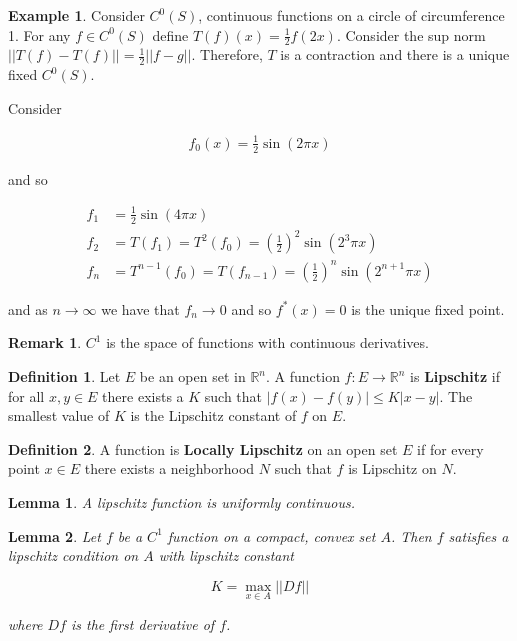 \documentclass[12pt]{article}
\newtheorem*{lemma}{Lemma}
\theoremstyle{definition}
\newtheorem*{definition}{Definition}
\newtheorem*{example}{Example}
\newtheorem*{remark}{Remark}
\begin{document}
\begin{example}
Consider $C^{0}(S)$, continuous functions on a circle of circumference 1. For any 
$f \in C^{0}(S)$ define $T(f)(x) = \frac{1}{2} f(2x)$. Consider the sup norm
$||T(f) - T(f)|| = \frac{1}{2} ||f - g||$. Therefore, $T$ is a contraction and
there is a unique fixed $C^{0}(S)$.

Consider

\begin{align*}
f_{0}(x) = \frac{1}{2}\sin (2\pi x)
\end{align*}

and so

\begin{align*}
f_1 &= \frac{1}{2} \sin (4\pi x) \\
f_2 &= T(f_1) = T^2 (f_0) = \left( \frac{1}{2} \right)^2 \sin (2^3 \pi x) \\
f_n &= T^{n-1} (f_0) = T(f_{n-1}) = \left( \frac{1}{2} \right)^n \sin (2^{n+1} \pi x)
\end{align*}

and as $n \rightarrow \infty$ we have that $f_n \rightarrow 0$ and so
$f^* (x) = 0$ is the unique fixed point.
\end{example}

\begin{remark}
$C^1$ is the space of functions with continuous derivatives.
\end{remark}

\begin{definition}
Let $E$ be an open set in $\mathbb{R}^n$. A function $f:E \rightarrow \mathbb{R}^n$ is \textbf{Lipschitz}
if for all $x, y \in E$ there exists a $K$ such that $|f(x) - f(y)| \leq K|x-y|$. The
smallest value of $K$ is the Lipschitz constant of $f$ on $E$.
\end{definition}

\begin{definition}
A function is \textbf{Locally Lipschitz} on an open set $E$ if for every point $x \in E$
there exists a neighborhood $N$ such that $f$ is Lipschitz on $N$.
\end{definition}

\begin{lemma}
A lipschitz function is uniformly continuous.
\end{lemma}

\begin{lemma}
Let $f$ be a $C^1$ function on a compact, convex set $A$. Then $f$ satisfies a lipschitz
condition on $A$ with lipschitz constant

\[
K = \max_{x \in A} ||Df||
\]

where $Df$ is the first derivative of $f$.
\end{lemma}
\end{document}

